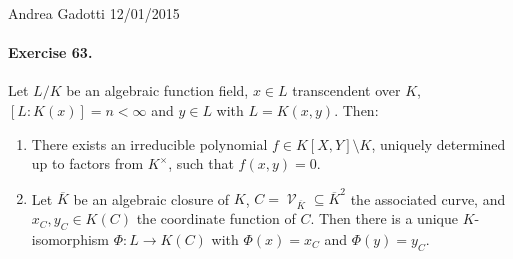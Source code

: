 \documentclass[12pt,a4paper]{report}
\theoremstyle{definition}
\theoremstyle{num.custom-title}
\DeclareMathOperator{\V}{\mathcal{V}}
\DeclareMathOperator{\sm}{\setminus}
\DeclareMathOperator{\sse}{\subseteq}
\newcommand{\ol}{\overline}
\begin{document}
\noindent Andrea Gadotti \hfill 12/01/2015

\paragraph{Exercise 63.} Let $L/K$ be an algebraic function field, $x \in L$ transcendent over $K$, $[L:K(x)] = n<\infty$ and $y \in L$ with $L=K(x,y)$. Then:
\begin{enumerate}
\item There exists an irreducible polynomial $f \in K[X,Y] \sm K$, uniquely determined up to factors from $K^\times$, such that $f(x,y)=0$.
\item Let $\ol{K}$ be an algebraic closure of $K$, $C = \V_{\ol{K}} \sse \ol{K}^2$ the associated curve, and $x_C,y_C \in K(C)$ the coordinate function of $C$. Then there is a unique $K$-isomorphism $\Phi : L \to K(C)$ with $\Phi(x)=x_C$ and $\Phi(y)=y_C$.
\end{enumerate}
\end{document}
